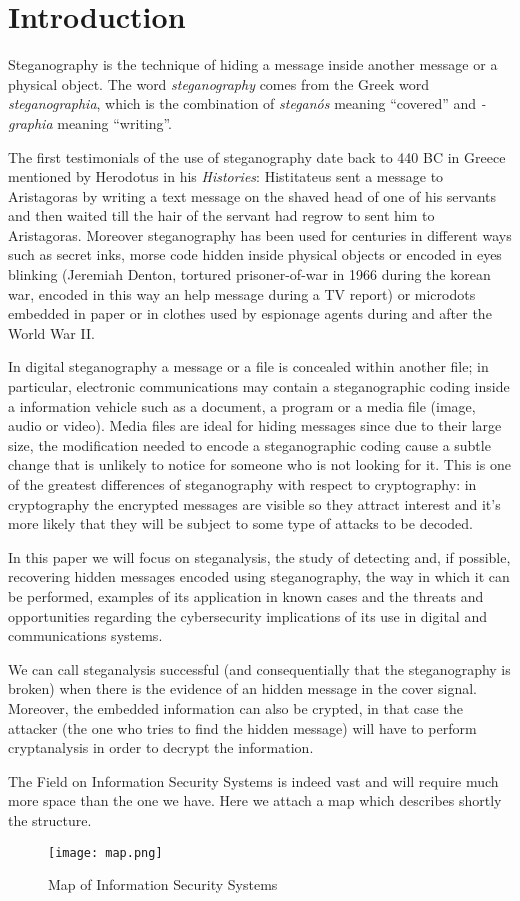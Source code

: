 \documentclass[../../main.tex]{subfiles}
\begin{document}
\section{Introduction}

Steganography is the technique of hiding a message inside another message or a
physical object.\cite{steganography-definition}
The word \emph{steganography} comes from the Greek word
\emph{steganographia}, which is the combination of \emph{steganós} meaning
``covered'' and \emph{-graphia} meaning ``writing''.

The first testimonials of the use of steganography date back to 440 BC in Greece
mentioned by Herodotus in his \emph{Histories}: Histitateus sent a message to
Aristagoras by writing a text message on the shaved head of one of his servants
and then waited till the hair of the servant had regrow to sent him to
Aristagoras.
Moreover steganography has been used for centuries in different ways such as
secret inks, morse code hidden inside physical objects or encoded in eyes
blinking (Jeremiah Denton, tortured prisoner-of-war in 1966 during the korean
war, encoded in this way an help message during a TV report) or microdots
embedded in paper or in clothes used by espionage agents during and after the
World War II.

In digital steganography a message or a file is concealed within another file;
in particular, electronic communications may contain a steganographic coding
inside a information vehicle such as a document, a program or a media file
(image, audio or video).
Media files are ideal for hiding messages since due to their large size, the
modification needed to encode a steganographic coding cause a subtle change that
is unlikely to notice for someone who is not looking for it.
This is one of the greatest differences of steganography with respect to
cryptography: in cryptography the encrypted messages are visible so they attract
interest and it's more likely that they will be subject to some type of attacks
to be decoded.

In this paper we will focus on steganalysis, the study of detecting and, if
possible, recovering hidden messages encoded using steganography, the way in
which it can be performed, examples of its application in known cases and
the threats and opportunities regarding the cybersecurity implications of its
use in digital and communications systems.

We can call steganalysis successful (and consequentially that the steganography
is broken) when there is the evidence of an hidden message in the cover signal.
Moreover, the embedded information can also be crypted, in that case the
attacker (the one who tries to find the hidden message) will have to perform
cryptanalysis in order to decrypt the information.

The Field on Information Security Systems is indeed vast and will require much
more space than the one we have. Here we attach a map which describes shortly
the structure.

\begin{figure}[h]
    \centering
    \caption{Map of Information Security Systems \cite{modern-text-hiding}}
    \texttt{[image: map.png]}
\end{figure}

\pagebreak
\end{document}
